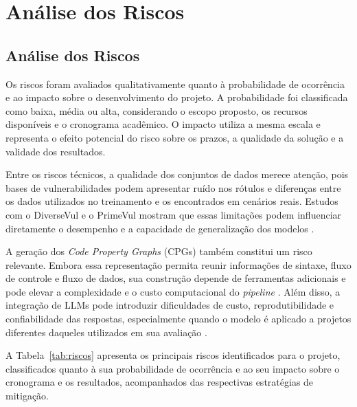 \chapter{Análise dos Riscos}
\label{cap:riscos}


\section{Análise dos Riscos}
\label{sec:riscos}

Os riscos foram avaliados qualitativamente quanto à probabilidade de
ocorrência e ao impacto sobre o desenvolvimento do projeto. A
probabilidade foi classificada como baixa, média ou alta, considerando
o escopo proposto, os recursos disponíveis e o cronograma acadêmico. O
impacto utiliza a mesma escala e representa o efeito potencial do risco
sobre os prazos, a qualidade da solução e a validade dos resultados.

Entre os riscos técnicos, a qualidade dos conjuntos de dados merece
atenção, pois bases de vulnerabilidades podem apresentar ruído nos
rótulos e diferenças entre os dados utilizados no treinamento e os
encontrados em cenários reais. Estudos com o DiverseVul e o PrimeVul
mostram que essas limitações podem influenciar diretamente o desempenho
e a capacidade de generalização dos modelos
\cite{chen2023diversevul,ding2024primevul,outofdistribution2025}.

A geração dos \textit{Code Property Graphs} (CPGs) também constitui um
risco relevante. Embora essa representação permita reunir informações
de sintaxe, fluxo de controle e fluxo de dados, sua construção depende
de ferramentas adicionais e pode elevar a complexidade e o custo
computacional do \textit{pipeline} \cite{yamaguchi2014cpg,chakraborty2021survey}.
Além disso, a integração de LLMs pode introduzir dificuldades de custo,
reprodutibilidade e confiabilidade das respostas, especialmente quando
o modelo é aplicado a projetos diferentes daqueles utilizados em sua
avaliação \cite{mdpi2026,ding2024primevul}.

A Tabela~\ref{tab:riscos} apresenta os principais riscos identificados
para o projeto, classificados quanto à sua probabilidade de ocorrência
e ao seu impacto sobre o cronograma e os resultados, acompanhados das
respectivas estratégias de mitigação.


